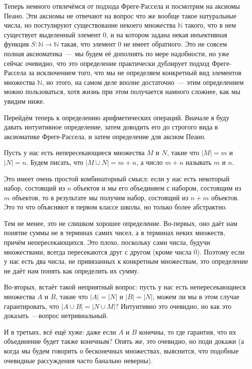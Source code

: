 Теперь немного отвлечёмся от подхода Фреге-Рассела и посмотрим на аксиомы Пеано. Эти аксиомы не отвечают на вопрос что же вообще такое натуральные числа, но постулируют существование некоего множества $\mathbb{N}$ такого, что в нем существует выделенный элемент 0, и на котором задана некая инъективная функция $S:\mathbb{N}\to\mathbb{N}$ такая, что элемент 0 не имеет обратного. Это не совсем полная аксиоматика~--- мы будем её дополнять по мере надобности, но уже сейчас очевидно, что это определение практически дублирует подход Фреге-Рассела за исключением того, что мы не определяем конкретный вид элементов множества $\mathbb{N}$, но этого, на самом деле вполне достаточно~--- этим определением можно пользоваться, хотя жизнь при этом получается намного сложнее, как мы увидим ниже.

Перейдём теперь к определению арифметических операций. Вначале я буду давать интуитивное определение, затем доводить его до строгого вида в аксиоматике Фреге-Рассела, и затем определение для аксиом Пеано.

\begin{definition}
Пусть у нас есть непересекающиеся множества $M$ и $N$, такие что $|M|=m$ и $|N| = n$. Будем писать, что $|M\cup N| = m+n$, а число $m+n$ называть  $m$ и $n$.
\end{definition}

Это имеет очень простой комбинаторный смысл: если у нас есть некоторый набор, состоящий из $n$ объектов и мы его объединяем с набором, состоящим из $m$ объектов, то в результате мы получим набор, состоящий из $n+m$ объектов. Это то что объясняют в первом классе школы, но только более абстрактно.

Тем не менее, это не слишком хорошее определение. Во-первых, оно даёт нам понятие суммы не в терминах самих чисел, а в терминах неких множеств, причём непересекающихся. Это плохо, поскольку сами числа, будучи множествами, всегда пересекаются друг с другом (кроме числа 0). Поэтому если у нас есть два числа, не привязанных к конкретным множествам, это определение не даёт нам понять как определить их сумму.

Во-вторых, встаёт такой неприятный вопрос: пусть у нас есть непересекающиеся множества $A$ и $B$, такие что $|A|=|N|$ и $|B|=|N|$, можем ли мы в этом случае гарантировать, что $|A\cup B| = |N\cup M|$? Интуитивно это очевидно, но как это доказать~---вопрос нетривиальный.

И в третьих, всё ещё хуже: даже если $A$ и $B$ конечны, то где гарантия, что их объединение будет также конечным? Опять же, это очевидно, но поди докажи (а когда мы будем говорить о бесконечных множествах, выяснится, что подобные очевидные рассуждения часто банально неверны).

